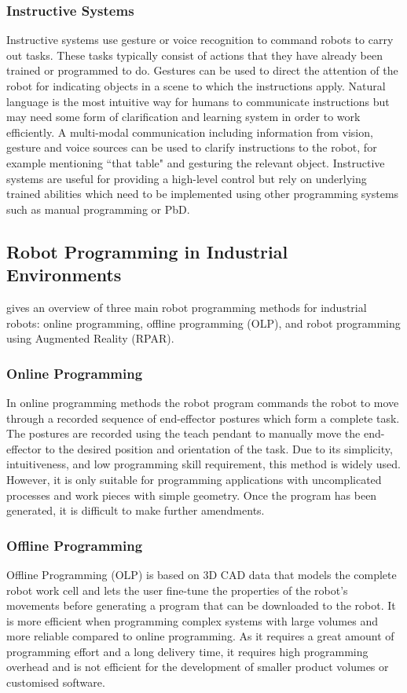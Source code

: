 \subsubsection{Instructive Systems}
Instructive systems use gesture or voice recognition to command robots to carry out tasks.
These tasks typically consist of actions that they have already been trained or programmed to do. 
Gestures can be used to direct the attention of the robot for indicating objects in a scene to which the instructions apply. 
Natural language is the most intuitive way for humans to communicate instructions but may need some form of clarification and learning system in order to work efficiently. 
A multi-modal communication including information from vision, gesture and voice sources can be used to clarify instructions to the robot, for example mentioning ``that table" and gesturing the relevant object.
Instructive systems are useful for providing a high-level control but rely on underlying trained abilities which need to be implemented using other programming systems such as manual programming or PbD.

\subsection{Robot Programming in Industrial Environments}\label{subsec:RP in Industrial Enviroments}
\cite{pan2012recent} gives an overview of three main robot programming methods for industrial robots: online programming, offline programming (OLP), and robot programming using Augmented Reality (RPAR). 

\subsubsection{Online Programming}\label{sssec:Online Programming}
In online programming methods the robot program commands the robot to move through a recorded sequence of end-effector postures which form a complete task. 
The postures are recorded using the teach pendant to manually move the end-effector to the desired position and orientation of the task. 
Due to its simplicity, intuitiveness, and low programming skill requirement, this method is widely used. 
However, it is only suitable for programming applications with uncomplicated processes and work pieces with simple geometry. 
Once the program has been generated, it is difficult to make further amendments.

\subsubsection{Offline Programming}\label{sssec:Offline Programming}
Offline Programming (OLP) is based on 3D CAD data that models the complete robot work cell and lets the user fine-tune the properties of the robot's movements before generating a program that can be downloaded to the robot. 
It is more efficient when programming complex systems with large volumes and more reliable compared to online programming. 
As it requires a great amount of programming effort and a long delivery time, it requires high programming overhead and is not efficient for the development of smaller product volumes or customised software.

